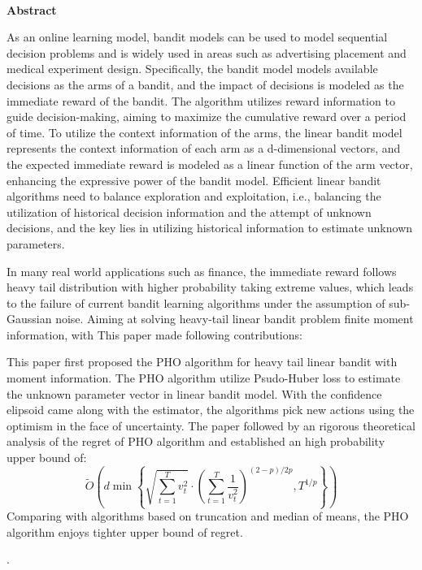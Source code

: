 \documentclass[UTF8,a4paper,10.5pt]{ctexart}
\begin{document}
~\\

\begin{center}
	\large{\textbf{Abstract}}
\end{center}

\normalsize{As an online learning model, bandit models can be used to model sequential decision problems and is widely used in areas such as advertising placement and medical experiment design. Specifically, the bandit model models available decisions as the arms of a bandit, and the impact of decisions is modeled as the immediate reward of the bandit. The algorithm utilizes reward information to guide decision-making, aiming to maximize the cumulative reward over a period of time. To utilize the context information of the arms, the linear bandit model represents the context information of each arm as a d-dimensional vectors, and the expected immediate reward is modeled as a linear function of the arm vector, enhancing the expressive power of the bandit model. Efficient linear bandit algorithms need to balance exploration and exploitation, i.e., balancing the utilization of historical decision information and the attempt of unknown decisions, and the key lies in utilizing historical information to estimate unknown parameters.\par
In many real world applications such as finance, the immediate reward follows heavy tail distribution with higher probability taking extreme values, which leads to the failure of current bandit learning algorithms under the assumption of sub-Gaussian noise. Aiming at solving heavy-tail linear bandit problem finite moment information, with This paper made following contributions: \par
This paper first proposed the PHO algorithm for heavy tail linear bandit with moment information. The PHO algorithm utilize Psudo-Huber loss to estimate the unknown parameter vector in linear bandit model. With the confidence elipsoid came along with the estimator, the algorithms pick new actions using the optimism in the face of uncertainty. The paper followed by an rigorous theoretical analysis of the regret of PHO algorithm and established an high probability upper bound of:
\begin{equation*}
	\tilde{O}\left(d\min \left\{\sqrt{\sum_{t=1}^{T}v_t^2}\cdot \left(\sum_{t=1}^{T}\frac{1}{v_t^2}\right)^{(2-p)/2p} ,T^{1/p}\right\}\right)
\end{equation*}
Comparing with algorithms based on truncation and median of means, the PHO algorithm enjoys tighter upper bound of regret.
}.
	
\end{document}
